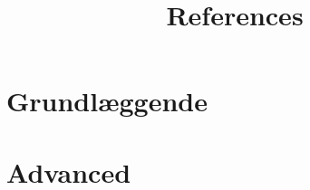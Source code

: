 \documentclass[10pt,a4paper,oneside]{report}
\begin{document}
\newpage
\newpage

\chapter{Grundlæggende}
\newpage
\newpage
\newpage
\newpage

\chapter{Advanced}
\newpage
\newpage
\newpage
\newpage

\newpage

\appendix

\newpage

\title{References}


\end{document}
